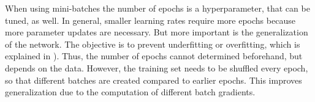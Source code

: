 When using mini-batches the number of epochs is a hyperparameter, that can be tuned, as well.
In general, smaller learning rates require more epochs because more parameter updates are necessary.
But more important is the generalization of the network.
The objective is to prevent underfitting or overfitting, which is explained in ).
Thus, the number of epochs cannot determined beforehand, but depends on the data.
However, the training set needs to be shuffled every epoch, so that different batches are created compared to earlier epochs.
This improves generalization due to the computation of different batch gradients.
